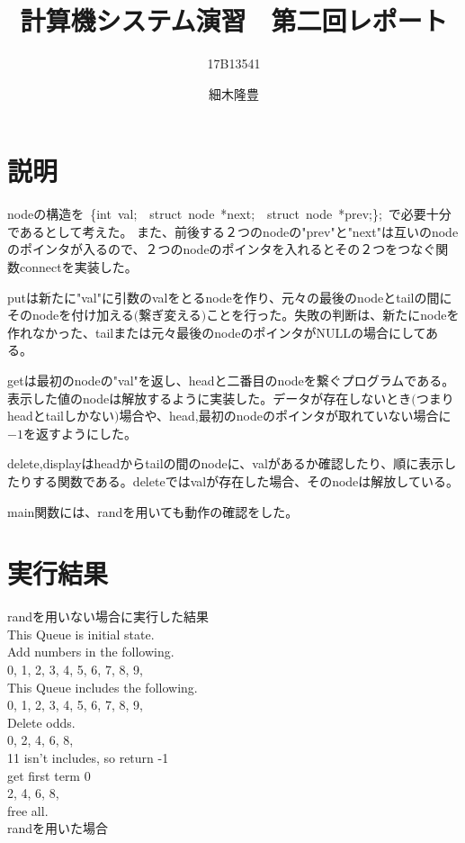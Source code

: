 \documentclass{jarticle}
\title{計算機システム演習　第二回レポート}
\author{17B13541 \and 細木隆豊}
\date{}
\begin{document}
 \maketitle
 
 \section{説明}
 nodeの構造を\ \{int\ val;\ \ struct\ node\ *next;\ \ struct\ node\ *prev;\};\ で必要十分であるとして考えた。
 また、前後する２つのnodeの"prev"と"next"は互いのnodeのポインタが入るので、２つのnodeのポインタを入れるとその２つをつなぐ関数connectを実装した。
 
 putは新たに"val"に引数のvalをとるnodeを作り、元々の最後のnodeとtailの間にそのnodeを付け加える$($繋ぎ変える$)$ことを行った。失敗の判断は、新たにnodeを作れなかった、tailまたは元々最後のnodeのポインタがNULLの場合にしてある。
 
 getは最初のnodeの"val"を返し、headと二番目のnodeを繋ぐプログラムである。表示した値のnodeは解放するように実装した。データが存在しないとき$($つまりheadとtailしかない$)$場合や、head,最初のnodeのポインタが取れていない場合に$-1$を返すようにした。
 
 delete,displayはheadからtailの間のnodeに、valがあるか確認したり、順に表示したりする関数である。deleteではvalが存在した場合、そのnodeは解放している。
 
 main関数には、randを用いても動作の確認をした。
 
 \section{実行結果}
 randを用いない場合に実行した結果\\
 
 This Queue is initial state.\\
 Add numbers in the following.\\ 
 0, 1, 2, 3, 4, 5, 6, 7, 8, 9,\\ 
 This Queue includes the following.\\ 
 0, 1, 2, 3, 4, 5, 6, 7, 8, 9,\\ 
 Delete odds.\\ 
 0, 2, 4, 6, 8,\\
 11 isn't includes, so return -1\\
 get first term 0\\
 2, 4, 6, 8,\\
 free all.\\
 
 randを用いた場合\\
 
\end{document}
